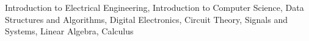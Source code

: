 
\begin{cvparagraph}
    Introduction to Electrical Engineering, Introduction to Computer Science, Data Structures and Algorithms, Digital Electronics, Circuit Theory, Signals and Systems, Linear Algebra, Calculus

\end{cvparagraph}